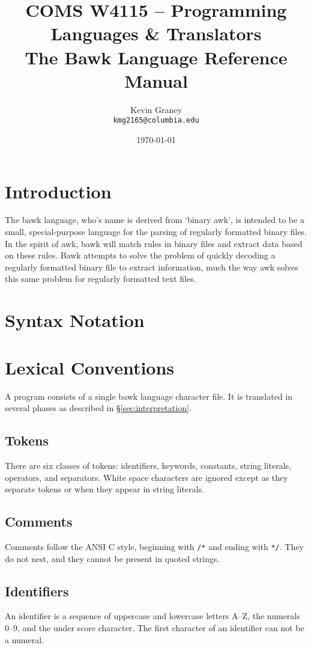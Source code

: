 \documentclass[letterpaper]{article}
\title{
	{\large COMS W4115 -- Programming Languages \& Translators}\\
	The Bawk Language Reference Manual}
\author{Kevin Graney\\
	\texttt{kmg2165@columbia.edu}}
\date{\today}
\begin{document}
\maketitle
\tableofcontents

\section{Introduction}
The bawk language, who's name is derived from `binary awk', is intended to be a small, special-purpose language for the parsing of regularly formatted binary files.  In the spirit of awk, bawk will match rules in binary files and extract data based on these rules.  Bawk attempts to solve the problem of quickly decoding a regularly formatted binary file to extract information, much the way awk solves this same problem for regularly formatted text files.

\section{Syntax Notation}


\section{Lexical Conventions}
A program consists of a single bawk language character file.  It is translated in several phases as described in \S\ref{sec:interpretation}.

\subsection{Tokens}
There are six classes of tokens: identifiers, keywords, constants, string literals, operators, and separators.  White space characters are ignored except as they separate tokens or when they appear in string literals.

\subsection{Comments}
Comments follow the ANSI C style, beginning with \texttt{/*} and ending with \texttt{*/}.  They do not nest, and they cannot be present in quoted strings.

\subsection{Identifiers}
\label{sec:identifiers}
An identifier is a sequence of uppercase and lowercase letters A--Z, the numerals 0--9, and the under score character.  The first character of an identifier can not be a numeral.
\end{document}
